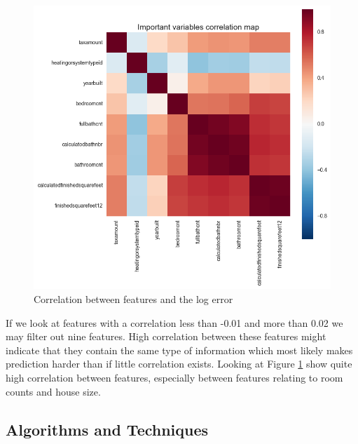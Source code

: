 \documentclass[a4paper]{article}
\begin{document}
\begin{figure}
\centering
\includegraphics[width=1\textwidth]{./img/prop-corr-feature.png}
\caption{\label{fig:prop-corr-feature} Correlation between features and the log error}
\end{figure}
If we look at features with a correlation less than -0.01 and more than 0.02 we may filter out nine features. High correlation between these features might indicate that they contain the same type of information which most likely makes prediction harder than if little correlation exists. Looking at Figure \ref{fig:prop-corr-feature} show quite high correlation between features, especially between features relating to room counts and house size.


\subsection{Algorithms and Techniques}
\end{document}
